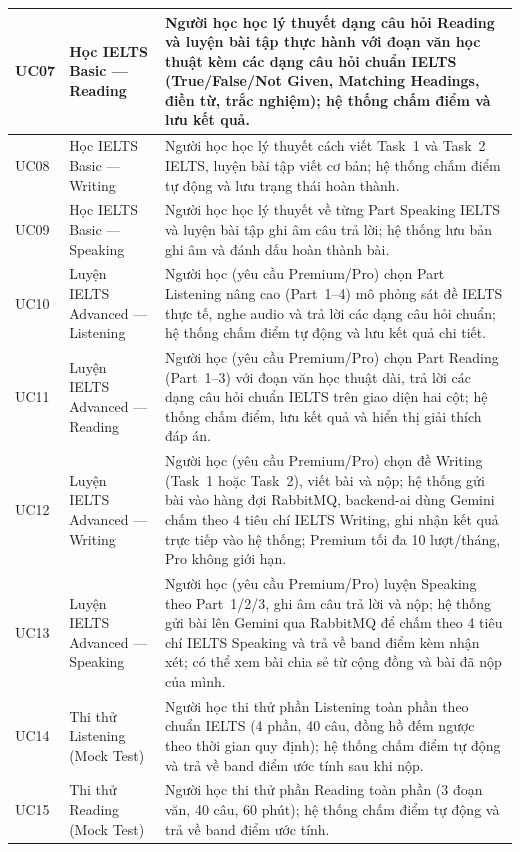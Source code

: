 \begin{longtable}{|p{15\tbu}|p{45\tbu}|p{90\tbu}|}
    UC07 & Học IELTS Basic --- Reading & Người học học lý thuyết dạng câu hỏi Reading và luyện bài tập thực hành với đoạn văn học thuật kèm các dạng câu hỏi chuẩn IELTS (True/False/Not Given, Matching Headings, điền từ, trắc nghiệm); hệ thống chấm điểm và lưu kết quả. \\ \hline
    UC08 & Học IELTS Basic --- Writing & Người học học lý thuyết cách viết Task~1 và Task~2 IELTS, luyện bài tập viết cơ bản; hệ thống chấm điểm tự động và lưu trạng thái hoàn thành. \\ \hline
    UC09 & Học IELTS Basic --- Speaking & Người học học lý thuyết về từng Part Speaking IELTS và luyện bài tập ghi âm câu trả lời; hệ thống lưu bản ghi âm và đánh dấu hoàn thành bài. \\ \hline
    UC10 & Luyện IELTS Advanced --- Listening & Người học (yêu cầu Premium/Pro) chọn Part Listening nâng cao (Part~1--4) mô phỏng sát đề IELTS thực tế, nghe audio và trả lời các dạng câu hỏi chuẩn; hệ thống chấm điểm tự động và lưu kết quả chi tiết. \\ \hline
    UC11 & Luyện IELTS Advanced --- Reading & Người học (yêu cầu Premium/Pro) chọn Part Reading (Part~1--3) với đoạn văn học thuật dài, trả lời các dạng câu hỏi chuẩn IELTS trên giao diện hai cột; hệ thống chấm điểm, lưu kết quả và hiển thị giải thích đáp án. \\ \hline
    UC12 & Luyện IELTS Advanced --- Writing & Người học (yêu cầu Premium/Pro) chọn đề Writing (Task~1 hoặc Task~2), viết bài và nộp; hệ thống gửi bài vào hàng đợi RabbitMQ, backend-ai dùng Gemini chấm theo 4 tiêu chí IELTS Writing, ghi nhận kết quả trực tiếp vào hệ thống; Premium tối đa 10 lượt/tháng, Pro không giới hạn. \\ \hline
    UC13 & Luyện IELTS Advanced --- Speaking & Người học (yêu cầu Premium/Pro) luyện Speaking theo Part~1/2/3, ghi âm câu trả lời và nộp; hệ thống gửi bài lên Gemini qua RabbitMQ để chấm theo 4 tiêu chí IELTS Speaking và trả về band điểm kèm nhận xét; có thể xem bài chia sẻ từ cộng đồng và bài đã nộp của mình. \\ \hline
    UC14 & Thi thử Listening (Mock Test) & Người học thi thử phần Listening toàn phần theo chuẩn IELTS (4 phần, 40 câu, đồng hồ đếm ngược theo thời gian quy định); hệ thống chấm điểm tự động và trả về band điểm ước tính sau khi nộp. \\ \hline
    UC15 & Thi thử Reading (Mock Test) & Người học thi thử phần Reading toàn phần (3 đoạn văn, 40 câu, 60 phút); hệ thống chấm điểm tự động và trả về band điểm ước tính. \\ \hline

\end{longtable}
